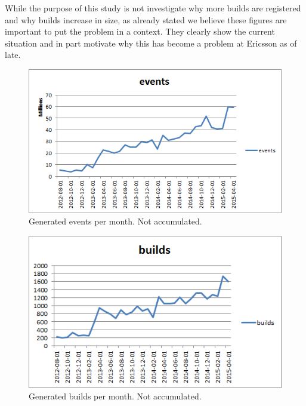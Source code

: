 While the purpose of this study is not investigate why more builds are registered and why builds increase in size, as already stated we believe these figures are important to put the problem in a context. They clearly show the current situation and in part motivate why this has become a problem at Ericsson as of late.

%

\begin{figure}[h!]
\centering
\includegraphics[]{figure/events.png}
\caption{Generated events per month. Not accumulated.}
\label{fig:events}
\end{figure}

\begin{figure}[h!]
\centering
\includegraphics[]{figure/builds.png}
\caption{Generated builds per month. Not accumulated.}
\label{fig:builds}
\end{figure}

